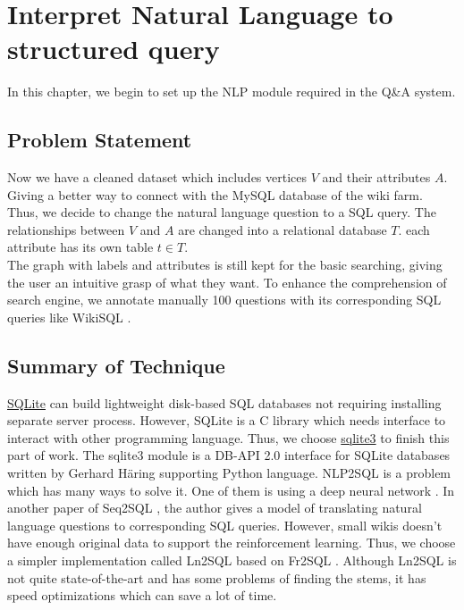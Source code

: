 \chapter{Interpret Natural Language to structured query}
\label{Ch-3:Sec:Extraction}
In this chapter, we begin to set up the NLP module required in the Q\&A system. 

\section{Problem Statement}
\vspace{-10pt}
Now we have a cleaned dataset which includes vertices $V$ and their attributes $A$. Giving a better way to connect with the MySQL database of the wiki farm. Thus, we decide to change the natural language question to a SQL query. The relationships between $V$ and $A$ are changed into a relational database $T$. each attribute has its own table $t \in T$.\\
\indent The graph with labels and attributes is still kept for the basic searching, giving the user an intuitive grasp of what they want. To enhance the comprehension of search engine, we annotate manually 100 questions with its corresponding SQL queries like WikiSQL \cite{yin2015neural}.

\section{Summary of Technique}
\vspace{-10pt}
\href{https://www.sqlite.org/index.html}{SQLite} can build lightweight disk-based SQL databases not requiring installing separate server process. However, SQLite is a C library which needs interface to interact with other programming language. Thus, we choose \href{https://docs.python.org/3.4/library/sqlite3.html}{sqlite3} to finish this part of work. The sqlite3 module is a DB-API 2.0 interface for SQLite databases written by Gerhard Häring supporting Python language. NLP2SQL is a problem which has many ways to solve it. One of them is using a deep neural network \cite{yin2015neural}. In another paper of Seq2SQL \cite{zhongSeq2SQL2017}, the author gives a model of translating natural language questions to corresponding SQL queries. However, small wikis doesn't have enough original data to support the reinforcement learning. Thus, we choose a simpler implementation called Ln2SQL based on Fr2SQL \cite{couderc2015fr2sql}. Although Ln2SQL is not quite state-of-the-art and has some problems of finding the stems, it has speed optimizations which can save a lot of time.

